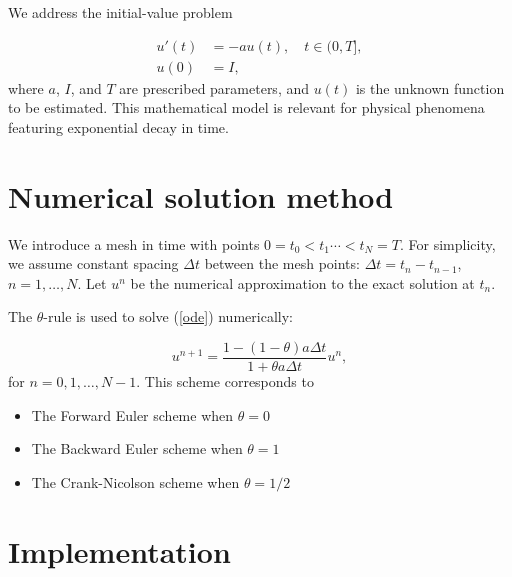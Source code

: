\documentclass[twoside]{article}
\begin{document}
\label{math:problem}

 

We address the initial-value problem

\begin{align}
u'(t) &= -au(t), \quad t \in (0,T], \label{ode}\\
u(0)  &= I,                         \label{initial:value}
\end{align}
where $a$, $I$, and $T$ are prescribed parameters, and $u(t)$ is
the unknown function to be estimated. This mathematical model
is relevant for physical phenomena featuring exponential decay
in time.



\section{Numerical solution method}

\label{numerical:problem}

  

We introduce a mesh in time with points $0= t_0< t_1 \cdots < t_N=T$.
For simplicity, we assume constant spacing $\Delta t$ between the
mesh points: $\Delta t = t_{n}-t_{n-1}$, $n=1,\ldots,N$. Let
$u^n$ be the numerical approximation to the exact solution at $t_n$.

The $\theta$-rule is used to solve (\ref{ode}) numerically:

\[
u^{n+1} = \frac{1 - (1-\theta) a\Delta t}{1 + \theta a\Delta t}u^n,
\]
for $n=0,1,\ldots,N-1$. This scheme corresponds to

\begin{itemize}
  \item The Forward Euler scheme when $\theta=0$

  \item The Backward Euler scheme when $\theta=1$

  \item The Crank-Nicolson scheme when $\theta=1/2$
\end{itemize}

\noindent


\section{Implementation}
\end{document}
